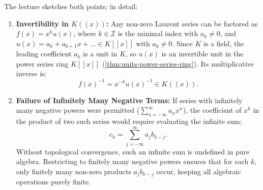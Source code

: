\begin{content}

\begin{steps}
The lecture sketches both points; in detail:
\begin{enumerate}[label=\textbf{(\arabic*)}]
    \item \textbf{Invertibility in $K((x))$:}
    Any non-zero Laurent series can be factored as $f(x) = x^k u(x)$, where $k \in \mathbb{Z}$ is the minimal index with $a_k \neq 0$, and $u(x) = a_k + a_{k+1} x + \dots \in K[[x]]$ with $a_k \neq 0$. Since $K$ is a field, the leading coefficient $a_k$ is a unit in $K$, so $u(x)$ is an invertible unit in the power series ring $K[[x]]$ (\cref{thm:units-power-series-ring}). Its multiplicative inverse is:
    \[
    f(x)^{-1} = x^{-k} u(x)^{-1} \in K((x)).
    \]
    \item \textbf{Failure of Infinitely Many Negative Terms:}
    If series with infinitely many negative powers were permitted ($\sum_{n=-\infty}^\infty a_n x^n$), the coefficient of $x^k$ in the product of two such series would require evaluating the infinite sum:
    \[
    c_k = \sum_{j=-\infty}^\infty a_j b_{k-j}.
    \]
    Without topological convergence, such an infinite sum is undefined in pure algebra. Restricting to finitely many negative powers ensures that for each $k$, only finitely many non-zero products $a_j b_{k-j}$ occur, keeping all algebraic operations purely finite.
\end{enumerate}
\end{steps}
\end{content}

